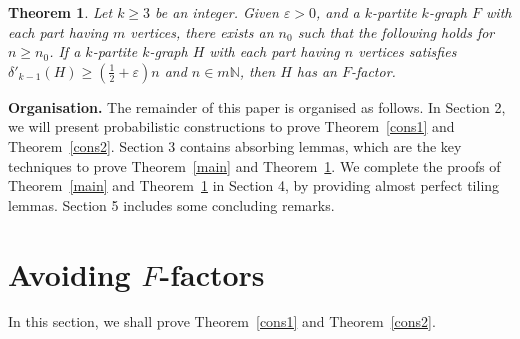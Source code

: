 \documentclass[11pt,a4paper]{article}
\newtheorem{thm}{Theorem}[section]
\theoremstyle{definition}
\begin{document}
\begin{thm}\label{degree}
    Let $k\geq 3$ be an integer. Given $\varepsilon >0$, and a $k$-partite $k$-graph $F$ with each part having $m$ vertices, there exists an $n_0$ such that the following holds for $n\geq n_0$. If a $k$-partite $k$-graph $H$ with each part having $n$ vertices satisfies $\delta'_{k-1}(H)\geq (\frac{1}{2}+\varepsilon)n$ and $n\in m\mathbb{N}$, then $H$ has an $F$-factor.
\end{thm}

\noindent \textbf{Organisation.} The remainder of this paper is organised as follows. In Section 2, we will present probabilistic constructions to prove Theorem~\ref{cons1} and Theorem~\ref{cons2}. Section 3 contains absorbing lemmas, which are the key techniques to prove Theorem~\ref{main} and Theorem~\ref{degree}. We complete the proofs of Theorem~\ref{main} and Theorem~\ref{degree} in Section 4, by providing almost perfect tiling lemmas. Section 5 includes some concluding remarks.

\section{Avoiding $F$-factors}

In this section, we shall prove Theorem~\ref{cons1} and Theorem~\ref{cons2}.
\end{document}
